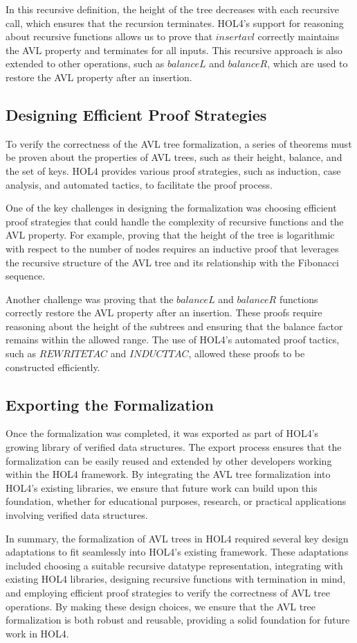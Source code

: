 In this recursive definition, the height of the tree decreases with each recursive call, which ensures that the recursion terminates. HOL4’s support for reasoning about recursive functions allows us to prove that \(insert avl\) correctly maintains the AVL property and terminates for all inputs. This recursive approach is also extended to other operations, such as \(balanceL\) and \(balanceR\), which are used to restore the AVL property after an insertion.

\subsection{Designing Efficient Proof Strategies}

To verify the correctness of the AVL tree formalization, a series of theorems must be proven about the properties of AVL trees, such as their height, balance, and the set of keys. HOL4 provides various proof strategies, such as induction, case analysis, and automated tactics, to facilitate the proof process.

One of the key challenges in designing the formalization was choosing efficient proof strategies that could handle the complexity of recursive functions and the AVL property. For example, proving that the height of the tree is logarithmic with respect to the number of nodes requires an inductive proof that leverages the recursive structure of the AVL tree and its relationship with the Fibonacci sequence.

Another challenge was proving that the \(balanceL\) and \(balanceR\) functions correctly restore the AVL property after an insertion. These proofs require reasoning about the height of the subtrees and ensuring that the balance factor remains within the allowed range. The use of HOL4’s automated proof tactics, such as \(REWRITE TAC\) and \(INDUCT TAC\), allowed these proofs to be constructed efficiently.

\subsection{Exporting the Formalization}

Once the formalization was completed, it was exported as part of HOL4’s growing library of verified data structures. The export process ensures that the formalization can be easily reused and extended by other developers working within the HOL4 framework. By integrating the AVL tree formalization into HOL4’s existing libraries, we ensure that future work can build upon this foundation, whether for educational purposes, research, or practical applications involving verified data structures.

In summary, the formalization of AVL trees in HOL4 required several key design adaptations to fit seamlessly into HOL4’s existing framework. These adaptations included choosing a suitable recursive datatype representation, integrating with existing HOL4 libraries, designing recursive functions with termination in mind, and employing efficient proof strategies to verify the correctness of AVL tree operations. By making these design choices, we ensure that the AVL tree formalization is both robust and reusable, providing a solid foundation for future work in HOL4.